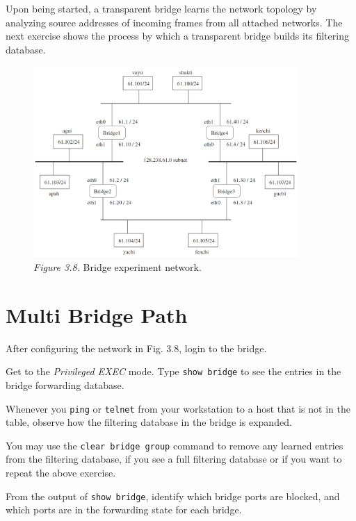 \documentclass{../UTNetLab}
\begin{document}
    Upon being started, a transparent bridge learns the network topology by analyzing source addresses of incoming frames from all attached networks.
    The next exercise shows the process by which a transparent bridge builds its filtering database.
    \begin{figure}[H]
        \centering
        \includegraphics[width=0.9\textwidth]{img/figure3-8.png}
        \caption{\textit{Figure 3.8.} Bridge experiment network.}
    \end{figure}

\section{Multi Bridge Path}
    After configuring the network in Fig. 3.8, login to the bridge.

    Get to the \textit{Privileged EXEC} mode. Type \lstinline[language={cisco}]{show bridge} to see the entries in the bridge forwarding database.

    Whenever you \lstinline{ping} or \lstinline{telnet} from your workstation to a host that is not in the table, observe how the filtering database in the bridge is expanded.

    You may use the \lstinline[language={cisco}, emph={group}]{clear bridge group} command to remove any learned entries from the filtering database, if you see a full filtering database or if you want to repeat the above exercise.

    \begin{report}
    \item From the output of \lstinline{show bridge}, identify which bridge ports are blocked, and which ports are in the forwarding state for each bridge.
    \end{report}
\end{document}
